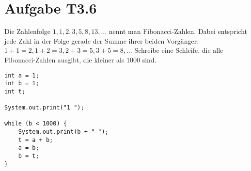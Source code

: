 \documentclass[final,a4paper]{article}
\begin{document}
\section*{Aufgabe T3.6}
Die Zahlenfolge $1, 1, 2, 3, 5, 8, 13, \ldots$ nennt man Fibonacci-Zahlen. Dabei entspricht jede Zahl
in der Folge gerade der Summe ihrer beiden Vorgänger: $1+1=2, 1+2=3, 2+3=5, 3+5=8, \ldots$
Schreibe eine Schleife, die alle Fibonacci-Zahlen ausgibt, die kleiner als $1000$ sind.

	\begin{lstlisting}
int a = 1;
int b = 1;
int t;

System.out.print("1 ");

while (b < 1000) {
	System.out.print(b + " ");
	t = a + b;
	a = b;
	b = t;
}
	\end{lstlisting}
\end{document}
